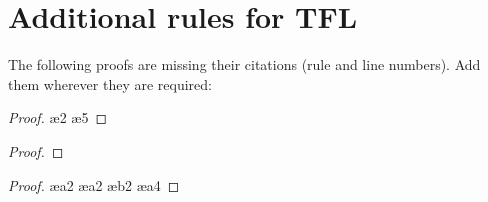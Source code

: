 \setcounter{chapter}{16}

\chapter{Additional rules for TFL}
\label{s:Further}
\setcounter{ProbPart}{0}
\problempart
\label{pr.justifyTFLproof}
The following proofs are missing their citations (rule and line numbers). Add them wherever they are required:
\begin{multicols}{2}
\begin{proof}
\ae{2}
\ae{5}
\end{proof}
\vfill
\begin{proof}
\open
\close
{}
\end{proof}
\columnbreak
\begin{proof}
\open
	\ae{a2}
	\ae{a2}
		\open
		\ae{b2}
	\close
	\ae{a4}
\close
{}
\end{proof}
\end{multicols}

